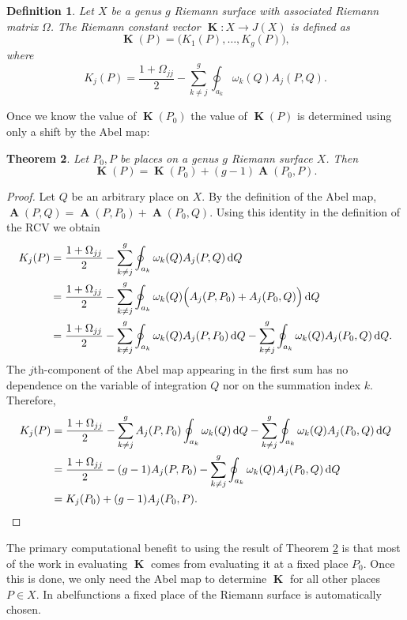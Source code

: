 \documentclass[12pt]{article}
\newtheorem{theorem}{Theorem}
\newtheorem{definition}[theorem]{Definition}
\theoremstyle{definition}
\newcommand{\dQ}{\,\mathrm{d}Q}
\DeclareMathOperator{\RCV}{\boldsymbol{K}}
\DeclareMathOperator{\Abel}{\boldsymbol{A}}
\begin{document}
\begin{definition} \label{def:rcv}
Let $X$ be a genus $g$ Riemann surface with associated Riemann matrix
$\Omega$. The Riemann constant vector $\RCV : X \to J(X)$ is defined as
\begin{equation} \label{eqn:rcv1}
  \RCV(P) = \big( K_1(P), \ldots, K_g(P) \big),
\end{equation}
where
\begin{equation} \label{eqn:rcv2}
  K_j(P) = \frac{1 + \Omega_{jj}}{2} - \sum_{k \neq j}^g
           \oint_{a_k} \omega_k(Q) A_j(P,Q).
\end{equation}
\end{definition}
Once we know the value of $\RCV(P_0)$ the value of $\RCV(P)$ is
determined using only a shift by the Abel map:
\begin{theorem} \label{thm:RCVshift}
  Let $P_0,P$ be places on a genus $g$ Riemann surface $X$. Then
  \begin{equation} \label{eqn:RCVshift}
    \RCV(P) = \RCV(P_0) + (g-1)\Abel(P_0,P).
  \end{equation}
\end{theorem}
\begin{proof}
Let $Q$ be an arbitrary place on $X$. By the definition of the Abel map,
$\Abel(P,Q) = \Abel(P,P_0) + \Abel(P_0,Q)$. Using this identity in the
definition of the RCV we obtain
\begin{align} \label{eqn:RCVshift1}
  K_j(P)
  &=
  \frac{1 + \Omega_{jj}}{2}
  -
  \sum_{k \neq j}^g
  \oint_{a_k} \omega_k(Q) A_j(P,Q) \dQ  \notag \\
  &=
  \frac{1 + \Omega_{jj}}{2}
  -
  \sum_{k \neq j}^g
  \oint_{a_k} \omega_k(Q) \Big( A_j(P,P_0) + A_j(P_0,Q) \Big) \dQ  \notag \\
  &=
  \frac{1 + \Omega_{jj}}{2}
  -
  \sum_{k \neq j}^g
  \oint_{a_k} \omega_k(Q) A_j(P,P_0) \dQ
  -
  \sum_{k \neq j}^g
  \oint_{a_k} \omega_k(Q) A_j(P_0,Q) \dQ.
\end{align}
The $j$th-component of the Abel map appearing in the first sum has no
dependence on the variable of integration $Q$ nor on the summation index
$k$. Therefore,
\begin{align} \label{eqn:RCVshift2}
  K_j(P)
  &=
  \frac{1 + \Omega_{jj}}{2}
  -
  \sum_{k \neq j}^g
  A_j(P,P_0)
  \oint_{a_k} \omega_k(Q) \dQ
  -
  \sum_{k \neq j}^g
  \oint_{a_k} \omega_k(Q) A_j(P_0,Q) \dQ \notag \\
  &=
  \frac{1 + \Omega_{jj}}{2}
  -
  (g-1) A_j(P,P_0)
  -
  \sum_{k \neq j}^g
  \oint_{a_k} \omega_k(Q) A_j(P_0,Q) \dQ \notag \\
  &=
  K_j(P_0) + (g-1)A_j(P_0,P).
\end{align}
\end{proof}
The primary computational benefit to using the result of Theorem
\ref{thm:RCVshift} is that most of the work in evaluating $\RCV$ comes
from evaluating it at a fixed place $P_0$. Once this is done, we only
need the Abel map to determine $\RCV$ for all other places $P \in X$. In
{\sc abelfunctions} a fixed place of the Riemann surface is
automatically chosen.
\end{document}

